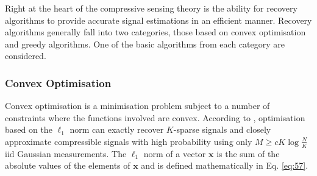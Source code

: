 Right at the heart of the compressive sensing theory is the ability for recovery algorithms to provide accurate signal estimations in an efficient manner. Recovery algorithms generally fall into two categories, those based on convex optimisation and greedy algorithms. One of the basic algorithms from each category are considered.   

\subsubsection{Convex Optimisation}
\label{sec:convex-optimization}

Convex optimisation is a minimisation problem subject to a number of constraints where the functions involved are convex. According to \cite{Baraniuk2007}, optimisation based on the $\ell_1$ norm can exactly recover $K$-sparse signals and closely approximate compressible signals with high probability using only $M  \geq cK \log \frac{N}{K} $ iid Gaussian measurements. The $\ell_1$ norm of a vector $\boldsymbol{x}$ is the sum of the absolute values of the elements of $\boldsymbol{x}$ and is defined mathematically in Eq. \eqref{eq:57}.  %

 


%
%


